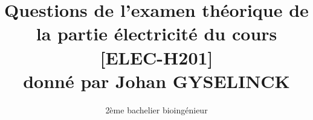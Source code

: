 

\author{2ème bachelier bioingénieur}

\title{Questions de l'examen théorique de la partie électricité du cours [ELEC-H201]\\ donné par Johan GYSELINCK}

\pagestyle{headandfoot}





\maketitle
\thispagestyle{headandfoot}


